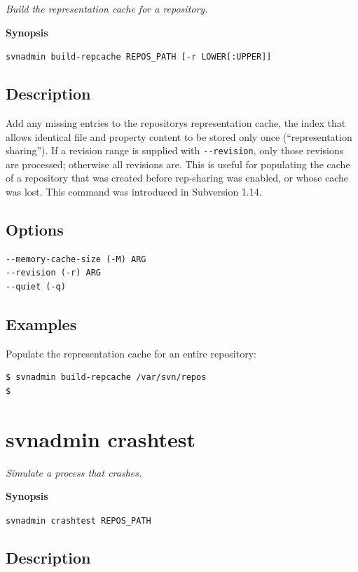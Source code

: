 \emph{Build the representation cache for a repository.}

\textbf{Synopsis}

\texttt{svnadmin\ build-repcache\ REPOS\_PATH\ {[}-r\ LOWER{[}:UPPER{]}{]}}

\subsection{Description}

Add any missing entries to the repository\textquotesingle s
representation cache, the index that allows identical file and property
content to be stored only once (``representation sharing''). If a
revision range is supplied with \texttt{-\/-revision}, only those
revisions are processed; otherwise all revisions are. This is useful for
populating the cache of a repository that was created before
rep-sharing was enabled, or whose cache was lost. This command was
introduced in Subversion 1.14.

\subsection{Options}

\begin{verbatim}
--memory-cache-size (-M) ARG
--revision (-r) ARG
--quiet (-q)
\end{verbatim}

\subsection{Examples}

Populate the representation cache for an entire repository:

\begin{verbatim}
$ svnadmin build-repcache /var/svn/repos
$
\end{verbatim}

\section{svnadmin crashtest}\label{svn.ref.svnadmin.c.crashtest}

\emph{Simulate a process that crashes.}

\textbf{Synopsis}

\texttt{svnadmin\ crashtest\ REPOS\_PATH}

\subsection{Description}

